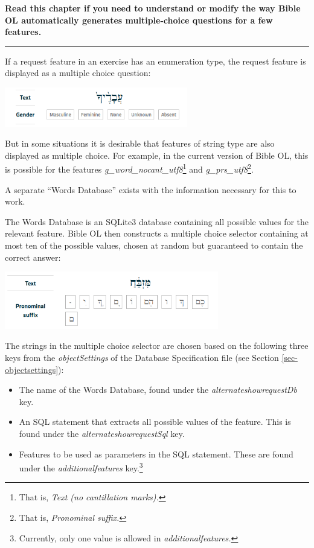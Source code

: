 \documentclass[11pt,oneside,a4paper]{memoir}
\begin{document}
\textbf{Read this chapter if you need to understand or modify the way Bible OL automatically
  generates multiple-choice questions for a few features.}
\plainbreak{3}


If a request feature in an exercise has an
enumeration type, the request feature is displayed as a multiple choice question:

\begin{center}
  \includegraphics[width=0.6\textwidth]{gender.png}
\end{center}

But in some situations it is desirable that features of string type are also displayed as multiple
choice. For example, in the current version of Bible OL, this is possible for the features
\emph{g\_word\_nocant\_utf8}\footnote{That is, \emph{Text (no cantillation marks).}} and
\emph{g\_prs\_utf8}\footnote{That is, \emph{Pronominal suffix.}}.

A separate ``Words Database'' exists with the information necessary for this to work.

The Words Database is an SQLite3 database containing all possible values for the relevant feature.
Bible OL then constructs a multiple choice selector containing at most ten of the possible values, chosen at
random but guaranteed to contain the correct answer:

\begin{center}
  \includegraphics[width=0.7\textwidth]{pronsuf.png}
\end{center}

The strings in the multiple choice selector are chosen based on the following three keys from the
\emph{objectSettings} of the Database Specification file (see Section
\ref{sec-objectsettings}):

\begin{itemize}
\item The name of the Words Database, found under the \emph{alternateshowrequestDb} key.
\item An SQL statement that extracts all possible values of the feature. This is found under the
  \emph{alternateshowrequestSql} key.
\item Features to be used as parameters in the SQL statement. These are found under the
  \emph{additionalfeatures} key.\footnote{Currently, only one value is allowed in \emph{additionalfeatures.}}
\end{itemize}
\end{document}
